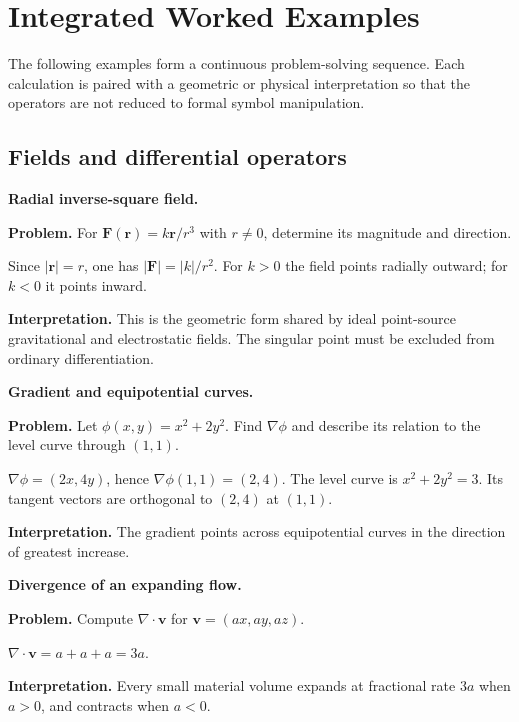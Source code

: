 \section{Integrated Worked Examples}
\label{sec:ch3-worked-examples}

The following examples form a continuous problem-solving sequence.  Each calculation is paired with a geometric or physical interpretation so that the operators are not reduced to formal symbol manipulation.

\subsection{Fields and differential operators}

\begin{workedexample}
\textbf{Radial inverse-square field.}\par
\textbf{Problem.} For $\mathbf F(\mathbf r)=k\mathbf r/r^3$ with $r\ne0$, determine its magnitude and direction.
\begin{solution}
Since $|\mathbf r|=r$, one has $|\mathbf F|=|k|/r^2$.  For $k>0$ the field points radially outward; for $k<0$ it points inward.

\textbf{Interpretation.} This is the geometric form shared by ideal point-source gravitational and electrostatic fields.  The singular point must be excluded from ordinary differentiation.
\end{solution}
\end{workedexample}

\begin{workedexample}
\textbf{Gradient and equipotential curves.}\par
\textbf{Problem.} Let $\phi(x,y)=x^2+2y^2$. Find $\nabla\phi$ and describe its relation to the level curve through $(1,1)$.
\begin{solution}
$\nabla\phi=(2x,4y)$, hence $\nabla\phi(1,1)=(2,4)$. The level curve is $x^2+2y^2=3$. Its tangent vectors are orthogonal to $(2,4)$ at $(1,1)$.

\textbf{Interpretation.} The gradient points across equipotential curves in the direction of greatest increase.
\end{solution}
\end{workedexample}

\begin{workedexample}
\textbf{Divergence of an expanding flow.}\par
\textbf{Problem.} Compute $\nabla\cdot\mathbf v$ for $\mathbf v=(ax,ay,az)$.
\begin{solution}
$\nabla\cdot\mathbf v=a+a+a=3a$.

\textbf{Interpretation.} Every small material volume expands at fractional rate $3a$ when $a>0$, and contracts when $a<0$.
\end{solution}
\end{workedexample}

